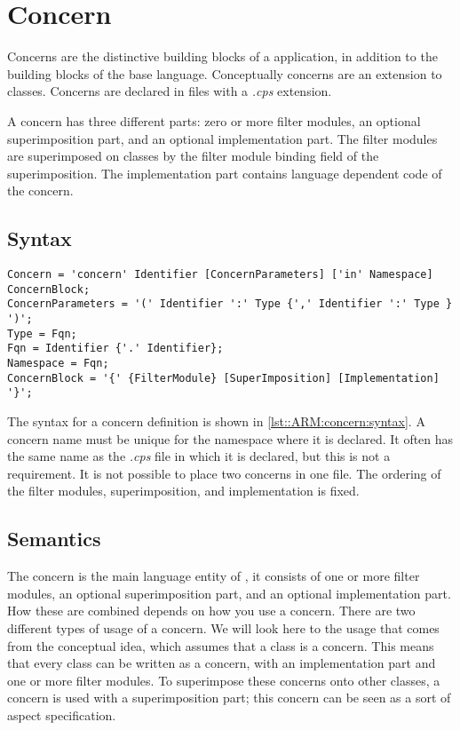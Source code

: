 \chapter{Concern} \label{chapter:concern}
Concerns are the distinctive building blocks of a \Compose* application, in addition to the building blocks of the base language. Conceptually concerns are an extension to classes.
Concerns are declared in files with a \emph{.cps} extension.

A concern has three different parts: zero or more filter modules, an optional superimposition part, and an optional implementation part. 
The filter modules are superimposed on classes by the filter module binding field of the superimposition. 
The implementation part contains language dependent code of the concern.

\section{Syntax}
\begin{lstlisting}[caption = {Concern syntax}, label = lst::ARM:concern:syntax, style = listing, language = {ebnf}, float = tpb]
Concern = 'concern' Identifier [ConcernParameters] ['in' Namespace] ConcernBlock;
ConcernParameters = '(' Identifier ':' Type {',' Identifier ':' Type } ')';
Type = Fqn;
Fqn = Identifier {'.' Identifier};
Namespace = Fqn;
ConcernBlock = '{' {FilterModule} [SuperImposition] [Implementation] '}';
\end{lstlisting}
The syntax for a concern definition is shown in \autoref{lst::ARM:concern:syntax}. 
A concern name must be unique for the namespace where it is declared.
It often has the same name as the \emph{.cps} file in which it is declared, but this is not a requirement.
It is not possible to place two concerns in one file.
The ordering of the filter modules, superimposition, and implementation is fixed.

\section{Semantics}
The concern is the main language entity of \Compose*, it consists of one or more filter modules, an optional superimposition part, and an optional implementation part. 
How these are combined depends on how you use a \Compose* concern. 
There are two different types of usage of a concern. 
We will look here to the usage that comes from the conceptual idea, which assumes that a class is a concern. 
This means that every class can be written as a concern, with an implementation part and one or more filter modules. 
To superimpose these concerns onto other classes, a concern is used with a superimposition part; this concern can be seen as a sort of aspect specification.

